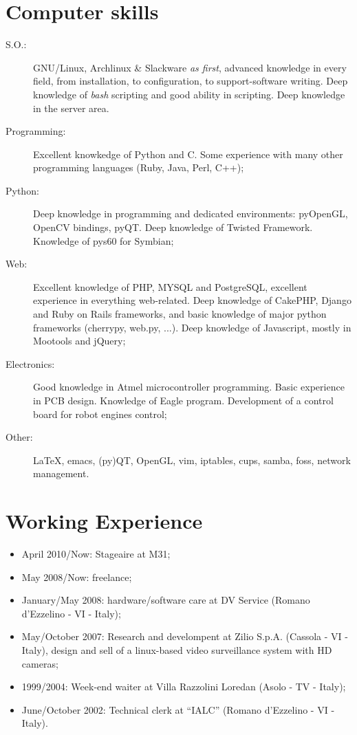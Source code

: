 \documentclass[pdftex, a4paper, 11pt]{article}
\begin{document}
\section*{Computer skills}
\begin{description}
\item[S.O.:] GNU/Linux, Archlinux \& Slackware {\em as first}, advanced knowledge
  in every field, from installation, to configuration, to support-software
  writing. Deep knowledge of {\em bash} scripting and good ability in scripting.
  Deep knowledge in the server area.
\item[Programming:] Excellent knowkedge of Python and C. Some experience with many other programming
  languages (Ruby, Java, Perl, C++);
\item[Python:] Deep knowledge in programming and dedicated environments: pyOpenGL,
  OpenCV bindings, pyQT. Deep knowledge of Twisted Framework. Knowledge of pys60
  for Symbian;
\item[Web:] Excellent knowledge of PHP, MYSQL and PostgreSQL, excellent experience in 
  everything web-related. Deep knowledge of CakePHP, Django and Ruby on Rails frameworks,
  and basic knowledge of major python frameworks (cherrypy, web.py, ...). Deep
  knowledge of Javascript, mostly in Mootools and jQuery;
\item[Electronics:] Good knowledge in Atmel microcontroller programming. Basic experience
  in PCB design. Knowledge of Eagle program. Development of a control board for robot
  engines control;
\item[Other:] \LaTeX, emacs, (py)QT, OpenGL, vim, iptables, cups,
  samba, foss, network management.
\end{description}

\section*{Working Experience}
\begin{itemize}
\item April 2010/Now: Stageaire at M31;
\item May 2008/Now: freelance;
\item January/May 2008: hardware/software care at DV Service (Romano d'Ezzelino - VI - Italy);
\item May/October 2007: Research and develompent at Zilio
  S.p.A. (Cassola - VI - Italy), design and sell of a linux-based video surveillance
  system with HD cameras;
\item 1999/2004: Week-end waiter at Villa Razzolini Loredan (Asolo - TV - Italy);
\item June/October 2002: Technical clerk at ``IALC'' (Romano d'Ezzelino - VI - Italy).
\end{itemize}
\end{document}
